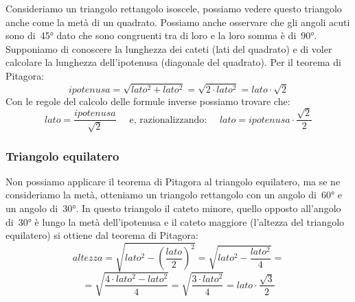  \begin{minipage}{.74\textwidth}
Consideriamo un triangolo rettangolo isoscele, possiamo vedere questo 
triangolo anche come la metà di un quadrato. 
Possiamo anche osservare che gli angoli acuti sono di~45° dato che sono 
congruenti tra di loro e la loro somma è di~90°.
Supponiamo di conoscere la lunghezza dei cateti (lati del quadrato) e di 
voler 
calcolare la lunghezza dell'ipotenusa (diagonale del quadrato).
Per il teorema di Pitagora:
\[ipotenusa = \sqrt{lato^2 +lato^2} = 
              \sqrt{2 \cdot lato^2} = lato \cdot \sqrt{2}\]
Con le regole del calcolo delle formule inverse possiamo trovare che:
\[lato = \frac{ipotenusa}{\sqrt{2}} \quad \text{ e, razionalizzando: } \quad 
  lato = ipotenusa \cdot \frac{\sqrt{2}}{2}\]
 \end{minipage}
\hfill
 \begin{minipage}{.24\textwidth}
\begin{inaccessibleblock}
\begin{center}
\mbox{}
\vspace{3mm}
\mbox{}
\vspace{3mm}
\end{center}
\end{inaccessibleblock}
 \end{minipage}
 
\subsubsection{Triangolo equilatero}

 \begin{minipage}{.69\textwidth}
Non possiamo applicare il teorema di Pitagora al triangolo equilatero, 
ma se ne consideriamo la metà, otteniamo un triangolo rettangolo con un 
angolo 
di~60° e un angolo di~30°. In questo triangolo il cateto minore, quello 
opposto 
all'angolo di~30° è lungo la metà dell'ipotenusa e il cateto maggiore 
(l'altezza del triangolo equilatero) si ottiene dal teorema di Pitagora:
\[altezza = \sqrt{lato^2 - \left (\frac{lato}{2} \right )^2} = 
            \sqrt{lato^2 - \frac{lato^2}{4}}= \]
\[          =\sqrt{\frac{4 \cdot lato^2 - lato^2}{4}}=
            \sqrt{\frac{3 \cdot lato^2}{4}}=
            lato \cdot \frac{\sqrt{3}}{2} \]
 \end{minipage}
 \begin{minipage}{.29\textwidth}
\begin{inaccessibleblock}
\begin{center}
\end{center}
\end{inaccessibleblock}
 \end{minipage}

